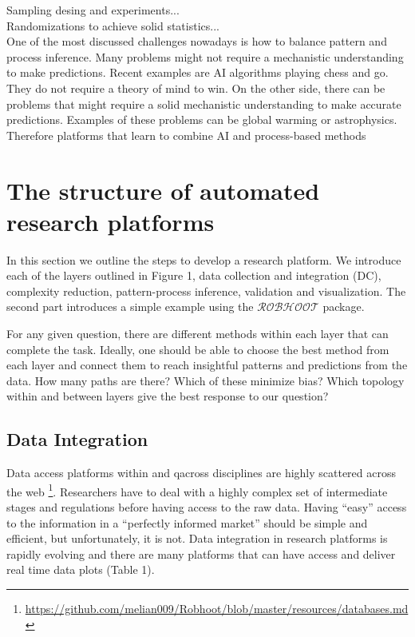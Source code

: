 \documentclass[english,12pt]{article}
\begin{document}
Sampling desing and experiments...\\

Randomizations to achieve solid statistics...\\

One of the most discussed challenges nowadays is how to balance
pattern and process inference. Many problems might not require a
mechanistic understanding to make predictions. Recent examples are AI
algorithms playing chess and go. They do not require a theory of mind
to win. On the other side, there can be problems that might require a
solid mechanistic understanding to make accurate predictions. Examples
of these problems can be global warming or astrophysics. Therefore
platforms that learn to combine AI and process-based methods



\section{The structure of automated research platforms}
In this section we outline the steps to develop a research
platform. We introduce each of the layers outlined in Figure 1, data
collection and integration (DC), complexity reduction, pattern-process
inference, validation and visualization. The second part introduces a
simple example using the $\mathcal{ROBHOOT}$ package.


For any given question, there are different
methods within each layer that can complete the task. Ideally, one
should be able to choose the best method from each layer and connect
them to reach insightful patterns and predictions from the data. How
many paths are there? Which of these minimize bias? Which topology
within and between layers give the best response to our question?

\subsection{Data Integration}

Data access platforms within and qacross disciplines are highly
scattered across the web
\footnote{\url{https://github.com/melian009/Robhoot/blob/master/resources/databases.md}}. Researchers
have to deal with a highly complex set of intermediate stages and
regulations before having access to the raw data. Having ``easy''
access to the information in a ``perfectly informed market'' should be
simple and efficient, but unfortunately, it is not. Data integration
in research platforms is rapidly evolving and there are many platforms
that can have access and deliver real time data plots (Table 1).
\end{document}
